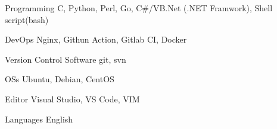 
\begin{cvskills}

  \cvskill
    {Programming} %
    {C, Python, Perl, Go, C\#/VB.Net (.NET Framwork), Shell script(bash)} %

  \cvskill
    {DevOps} %
    {Nginx, Githun Action, Gitlab CI, Docker} %

  \cvskill
    {Version Control Software} %
    {git, svn} %

  \cvskill
    {OSs} %
    {Ubuntu, Debian, CentOS} %

  \cvskill
    {Editor} %
    {Visual Studio, VS Code, VIM} %

  \cvskill
    {Languages} %
    {English} %

\end{cvskills}
